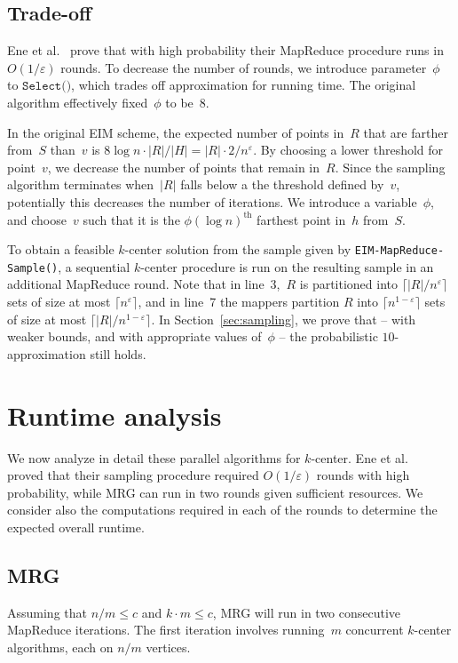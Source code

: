 \documentclass[11pt]{article}
\newcommand{\eps}{\ensuremath{\varepsilon}}
\newcommand{\ours}{{\sc MRG}\xspace}
\newcommand{\ene}{{\sc EIM}\xspace}
\begin{document}
\subsection{Trade-off}
Ene et al.~\cite{ene2011fast} prove that with high probability their MapReduce
procedure runs in $O(1/\eps)$ rounds.  
To decrease the number of rounds, we introduce parameter~$\phi$ to
$\texttt{Select()}$, which
trades off approximation for running time.
The original algorithm effectively fixed~$\phi$ to be~$8$.




In the original \ene scheme,
the expected number of points in~$R$ that are farther from~$S$ than~$v$ is
$8\log n\cdot|R|/|H|=|R| \cdot 2/n^{\eps}$.
By choosing a lower threshold for point~$v$, we decrease the number of points that remain in~$R$.
Since the sampling algorithm terminates when~$|R|$ falls below a the threshold defined by~$v$,
potentially this decreases the number of iterations.
We introduce a variable~$\phi$, and choose~$v$ such that it is
the $\phi(\log n)^{\text{th}}$ farthest point in~$h$ from~$S$. 



To obtain a feasible $k$-center solution from the sample given by 
\texttt{EIM-MapReduce-Sample()},
a sequential $k$-center procedure is run on the resulting sample
in an additional MapReduce round. 
Note that in line~3,~$R$ is partitioned into $\lceil|R|/n^{\eps}\rceil$ sets of size
at most $\lceil n^{\eps}\rceil$, and in line~7 the mappers partition  $R$ into $\lceil n^{1-\eps}\rceil$ sets of size at most  $\lceil|R|/n^{1-\eps}\rceil$.
In Section~\ref{sec:sampling}, we prove that -- with weaker bounds, and with
appropriate values of~$\phi$ -- the probabilistic
$10$-approximation still holds.


\section{Runtime analysis}
\label{sec:runtime}


We now analyze in detail these parallel algorithms for $k$-center.
Ene et al.~\cite{ene2011fast} proved that their sampling procedure required $O(1/\eps)$ rounds with high probability, while \ours can run in two rounds given sufficient resources.
We consider also the computations required in each of the rounds to determine the expected overall runtime.


\subsection{\ours}
Assuming that $n/ m \leq c$ and $k\cdot m\leq c$, \ours will run in two consecutive MapReduce iterations.
The first iteration involves running~$m$ concurrent $k$-center algorithms,
each on $n/m$ vertices. 
\end{document}
